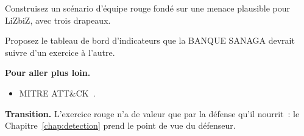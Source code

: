 \begin{boxexo}[title={\ding{45}\quad Exercice~20.9. Scénario \niveauexpert}]
Construisez un scénario d'équipe rouge fondé sur une menace plausible pour
LiZbiZ, avec trois drapeaux.
\end{boxexo}

\begin{boxexo}[title={\ding{45}\quad Exercice~20.10. Tableau de bord \niveauexpert}]
Proposez le tableau de bord d'indicateurs que la BANQUE SANAGA devrait
suivre d'un exercice à l'autre.
\end{boxexo}

\bigskip

\begin{boxinfo}
\textbf{Pour aller plus loin.}
\begin{itemize}
    \item MITRE ATT\&CK~\cite{mitreattack}.
\end{itemize}
\end{boxinfo}

\begin{boxinfo}
\textbf{Transition.} L'exercice rouge n'a de valeur que par la défense qu'il
nourrit~: le Chapitre~\ref{chap:detection} prend le point de vue du
défenseur.
\end{boxinfo}
